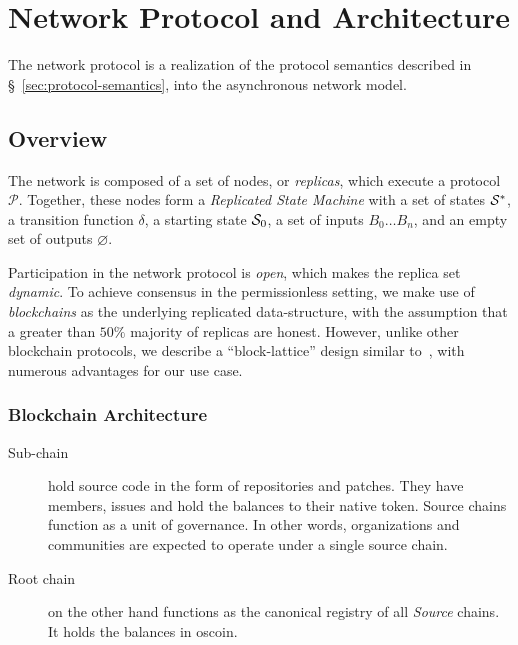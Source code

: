 \section{Network Protocol and Architecture}

The \oscoin{} network protocol is a realization of the protocol semantics
described in \S~\ref{sec:protocol-semantics}, into the asynchronous network
model.

\subsection{Overview}


The \oscoin{} network is composed of a set of nodes, or \emph{replicas}, which
execute a protocol $\mathcal{P}$. Together, these nodes form a \emph{Replicated
State Machine} with a set of states $\mathcal{S}^*$, a transition function $\delta$,
a starting state $\mathcal{S}_0$, a set of inputs $B_0 \dotso B_n$, and an empty set
of outputs $\varnothing$.

Participation in the network protocol is \emph{open}, which makes the replica
set \emph{dynamic}. To achieve consensus in the permissionless setting, we make
use of \emph{blockchains} as the underlying replicated data-structure, with the
assumption that a greater than $50\%$ majority of replicas are honest.
However, unlike other blockchain protocols, we describe a ``block-lattice''
design similar to~\cite{raiblocks}, with numerous advantages for our use case.

\subsubsection{Blockchain Architecture}


\begin{description}
    \item[Sub-chain] hold source code in the form of repositories and
        patches.  They have members, issues and hold the balances to their
        native token.  Source chains function as a unit of governance.  In
        other words, organizations and communities are expected to operate
        under a single source chain.
    \item[Root chain] on the other hand functions as the canonical registry
        of all \emph{Source} chains. It holds the balances in oscoin.
\end{description}

